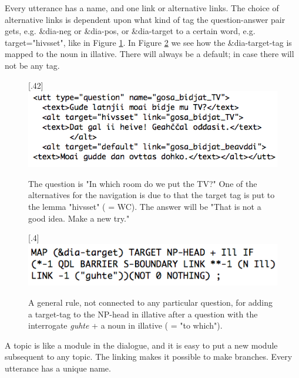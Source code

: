 \documentclass[11pt]{article}
\begin{document}
Every utterance has a name, and one link or alternative links. The choice of alternative links is dependent upon what kind of tag the question-answer pair gets, e.g. \&dia-neg or \&dia-pos, or \&dia-target to a certain word, e.g. target="hivsset", like in Figure \ref{TV}.  In Figure \ref{targetIll} we see how the \&dia-target-tag is mapped to the noun in illative. There will always be a default; in case there will not be any tag. \\

\begin{figure}[htbp]
\begin{center}
\scalebox{.40}[.42]{\includegraphics{presentation/img/gosabidjatTV2.png}}
\caption{The question is "In which room do we put the TV?" One of the alternatives for the navigation is due to that the target tag is put to the lemma "hivsset" ( = WC). The answer will be "That is not a good idea. Make a new try."}
\label{TV}
\end{center}
\end{figure}


\begin{figure}[htbp]
\begin{center}
\scalebox{.4}[.4]{\includegraphics{presentation/img/targetIll2.png}}
\caption{A general rule, not connected to any particular question, for adding a target-tag to the NP-head in illative after a question with the interrogate \textit{guhte} + a noun in illative ( = "to which").}
\label{targetIll}
\end{center}
\end{figure}

A topic is like a module in the dialogue, and it is easy to put a new module subsequent to any topic. The linking makes it possible to make branches. Every utterance has a unique name.  
\end{document}
